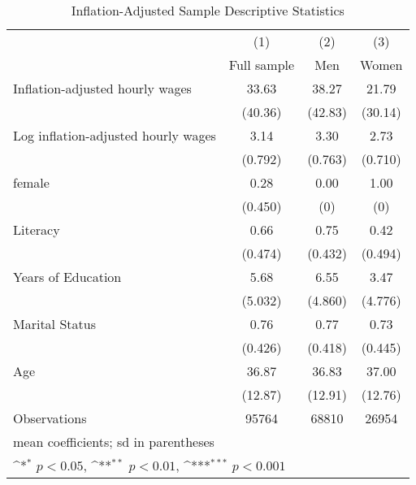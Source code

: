 \begin{table}[htbp]\centering
\def\sym#1{\ifmmode^{#1}\else\(^{#1}\)\fi}
\caption{Inflation-Adjusted Sample Descriptive Statistics}
\begin{tabular}{l*{3}{c}}
\hline\hline
                    &\multicolumn{1}{c}{(1)}&\multicolumn{1}{c}{(2)}&\multicolumn{1}{c}{(3)}\\
                    &\multicolumn{1}{c}{Full sample}&\multicolumn{1}{c}{Men}&\multicolumn{1}{c}{Women}\\
\hline
Inflation-adjusted hourly wages&       33.63         &       38.27         &       21.79         \\
                    &     (40.36)         &     (42.83)         &     (30.14)         \\
[1em]
Log inflation-adjusted hourly wages&        3.14         &        3.30         &        2.73         \\
                    &     (0.792)         &     (0.763)         &     (0.710)         \\
[1em]
female              &        0.28         &        0.00         &        1.00         \\
                    &     (0.450)         &         (0)         &         (0)         \\
[1em]
Literacy            &        0.66         &        0.75         &        0.42         \\
                    &     (0.474)         &     (0.432)         &     (0.494)         \\
[1em]
Years of Education  &        5.68         &        6.55         &        3.47         \\
                    &     (5.032)         &     (4.860)         &     (4.776)         \\
[1em]
Marital Status      &        0.76         &        0.77         &        0.73         \\
                    &     (0.426)         &     (0.418)         &     (0.445)         \\
[1em]
Age                 &       36.87         &       36.83         &       37.00         \\
                    &     (12.87)         &     (12.91)         &     (12.76)         \\
\hline
Observations        &       95764         &       68810         &       26954         \\
\hline\hline
\multicolumn{4}{l}{\footnotesize mean coefficients; sd in parentheses}\\
\multicolumn{4}{l}{\footnotesize \sym{*} \(p<0.05\), \sym{**} \(p<0.01\), \sym{***} \(p<0.001\)}\\
\end{tabular}
\end{table}
